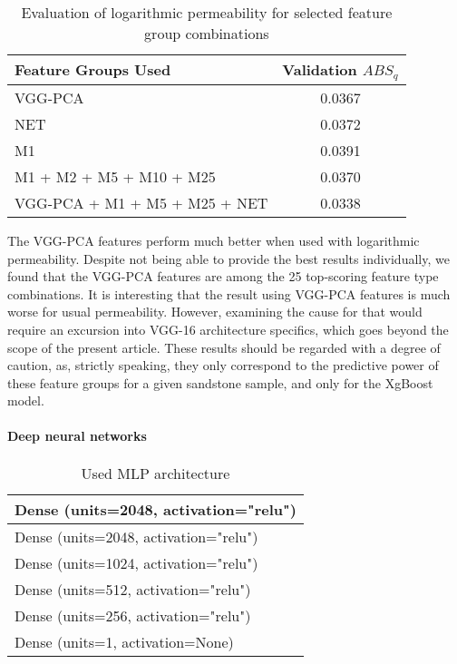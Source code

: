 \documentclass[review]{elsarticle}
\begin{document}
\begin{table}[H]
  \centering
  \caption{Evaluation of logarithmic permeability for selected feature group combinations} \label{tab:tab4}
  \begin{tabular}{ | l | c | }
    \hline
    Feature Groups Used & Validation $ABS_q$ \\ \hline
    VGG-PCA & 0.0367 \\ \hline
    NET & 0.0372 \\ \hline
    M1 & 0.0391 \\ \hline
    M1 + M2 + M5 + M10 + M25 & 0.0370 \\ \hline
    VGG-PCA + M1 + M5 + M25 + NET & 0.0338 \\ \hline
  \end{tabular}
\end{table}

The VGG-PCA features perform much better when used with logarithmic permeability. Despite not being able to provide the best results individually, we found that the VGG-PCA features are among the 25 top-scoring feature type combinations. It is interesting that the result using VGG-PCA features is much worse for usual permeability. However, examining the cause for that would require an excursion into VGG-16 architecture specifics, which goes beyond the scope of the present article.
These results should be regarded with a degree of caution, as, strictly speaking, they only correspond to the predictive power of these feature groups for a given sandstone sample, and only for the XgBoost model.

\paragraph{Deep neural networks}

\setlength\intextsep{0pt}
\begin{wraptable}[8]{r}{0.55\textwidth}
  \centering
  \caption{Used MLP architecture}\label{tab:tab5}
  \begin{tabular}{ | l |}
    \hline
    Dense (units=2048, activation="relu") \\ \hline
    Dense (units=2048, activation="relu") \\ \hline
    Dense (units=1024, activation="relu") \\ \hline
    Dense (units=512, activation="relu") \\ \hline
    Dense (units=256, activation="relu") \\ \hline
    Dense (units=1, activation=None) \\ \hline
  \end{tabular}
\end{wraptable}
\end{document}
